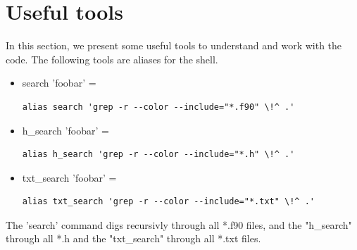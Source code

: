 \documentclass[12pt]{article}
\begin{document}
\section{Useful tools}
\label{sec:tools}
\FloatBarrier
In this section, we present some useful tools to understand and work with the code. The following tools are aliases for the shell. 
\begin{itemize}
	\item search 'foobar' = \begin{verbatim}alias search 'grep -r --color --include="*.f90" \!^ .' \end{verbatim}
	\item h\_search 'foobar' = \begin{verbatim}alias h_search 'grep -r --color --include="*.h" \!^ .'	 \end{verbatim}
	\item txt\_search 'foobar' = \begin{verbatim}alias txt_search 'grep -r --color --include="*.txt" \!^ .' \end{verbatim}
\end{itemize}
The 'search' command digs recursivly through all *.f90 files, and the "h\_search" through all *.h and the "txt\_search" through all *.txt files.
\end{document}
